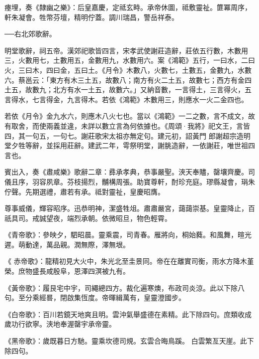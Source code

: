 \begin{pinyinscope}
 瘞埋，奏《隸幽之樂》：后皇嘉慶，定祗玄畤。承帝休圖，祗敷靈祉。篚冪周序，
 軒朱凝會。牲幣芬壇，精明佇蓋。調川瑞昌，警岳祥泰。



 ──右北郊歌辭。



 明堂歌辭，祠五帝。漢郊祀歌皆四言，宋孝武使謝莊造辭，莊依五行數，木數用三，火數用七，土數用五，金數用九，水數用六。案《鴻範》五行，一曰水，二曰火，三曰木，四曰金，五曰土。《月令》木數八，火數七，土數五，金數九，水數六。蔡邕云：「東方有木三土五，故數八；南方有火二土五，故數七；西方有金四土五，故數九；北方有水一土五，故數六。」又納音數，一言得土，三言得火，五言得水，七言得金，九言得木。若依《鴻範》木數用三，則應水一火二金四也。



 若依《月令》金九水六，則應木八火七也。當以《鴻範》一二之數，言不成文，故有取舍，而使兩義並違，未詳以數立言為何依據也。《周頌·我將》祀文王，言皆四，其一句五，一句七。謝莊歌宋太祖亦無定句。建元初，詔黃門
 郎謝超宗造明堂夕牲等辭，並採用莊辭。建武二年，雩祭明堂，謝朓造辭，一依謝莊，唯世祖四言也。



 賓出入，奏《肅咸樂》歌辭二章：彞承孝典，恭事嚴聖。浹天奉贐，罄壤齊慶。司儀且序，羽容夙章。芬枝揚烈，黼構周張。助寶尊軒，酎珍充庭。璆縣凝會，琄朱佇聲。先期選禮，肅若有承。祗對靈祉，皇慶昭膺。



 尊事威儀，輝容昭序。迅恭明神，潔盛牲俎。肅肅嚴宮，藹藹崇基。皇靈降止，百祇具司。戒誠望夜，端烈承朝。依微昭旦，物色輕霄。



 《青帝歌》：參映夕，駟昭晨。靈乘震，司青春。雁將向，桐始蕤。和風舞，暄光遲。萌動達，萬品親。潤無際，澤無垠。



 《
 赤帝歌》：龍精初見大火中，朱光北至圭景同。帝在在離實司衡，雨水方降木堇榮。庶物盛長咸殷阜，恩澤四溟被九有。



 《黃帝歌》：履艮宅中宇，司繩總四方。裁化遍寒燠，布政司炎涼。此以下除八句。至分乘經晷，閉啟集恆度。帝暉緝萬有，皇靈澄國步。



 《白帝歌》：百川若鏡天地爽且明。雲沖氣舉盛德在素精。此下除四句。庶類收成歲功行欲寧。浹地奉渥罄宇承帝靈。



 《黑帝歌》：歲既暮日方馳。靈乘坎德司規。玄雲合晦鳥蹊。
 白雲繁亙天崖。此下除四句。




\end{pinyinscope}
